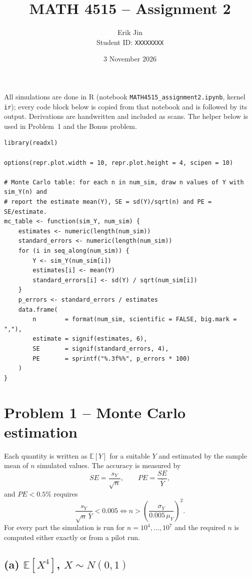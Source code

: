 \documentclass[11pt,a4paper]{article}
\title{MATH 4515 -- Assignment 2}
\author{Erik Jin \\ Student ID: \texttt{XXXXXXXX}}
\date{3 November 2026}
\begin{document}
\maketitle

\noindent All simulations are done in R (notebook \texttt{MATH4515\_assignment2.ipynb}, kernel \texttt{ir}); every
code block below is copied from that notebook and is followed by its output. Derivations are handwritten and
included as scans. The helper below is used in Problem~1 and the Bonus problem.

\begin{lstlisting}
library(readxl)

options(repr.plot.width = 10, repr.plot.height = 4, scipen = 10)

# Monte Carlo table: for each n in num_sim, draw n values of Y with sim_Y(n) and
# report the estimate mean(Y), SE = sd(Y)/sqrt(n) and PE = SE/estimate.
mc_table <- function(sim_Y, num_sim) {
    estimates <- numeric(length(num_sim))
    standard_errors <- numeric(length(num_sim))
    for (i in seq_along(num_sim)) {
        Y <- sim_Y(num_sim[i])
        estimates[i] <- mean(Y)
        standard_errors[i] <- sd(Y) / sqrt(num_sim[i])
    }
    p_errors <- standard_errors / estimates
    data.frame(
        n        = format(num_sim, scientific = FALSE, big.mark = ","),
        estimate = signif(estimates, 6),
        SE       = signif(standard_errors, 4),
        PE       = sprintf("%.3f%%", p_errors * 100)
    )
}
\end{lstlisting}

\section*{Problem 1 -- Monte Carlo estimation}

Each quantity is written as $\mathbb{E}[Y]$ for a suitable $Y$ and estimated by the sample mean of $n$ simulated
values. The accuracy is measured by
\[
  SE = \frac{s_Y}{\sqrt n}, \qquad PE = \frac{SE}{\bar Y},
\]
and $PE < 0.5\%$ requires
\[
  \frac{s_Y}{\sqrt n\,\bar Y} < 0.005 \iff n > \left(\frac{\sigma_Y}{0.005\,\mu_Y}\right)^2 .
\]
For every part the simulation is run for $n = 10^4, \dots, 10^7$ and the required $n$ is computed either
exactly or from a pilot run.

\subsection*{(a) $\mathbb{E}[X^4]$, $X \sim N(0,1)$}
\end{document}
